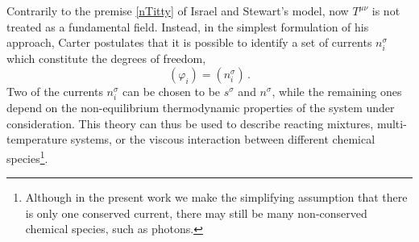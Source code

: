 \documentclass[a4paper, amsfonts, amssymb, amsmath, reprint, twocolumn, showkeys, nofootinbib]{revtex4-2}
\begin{document}
Contrarily to the premise \eqref{nTitty} of Israel and Stewart's model, now $T^{\mu \nu}$ is not treated  as a fundamental field. Instead, in the simplest formulation of his approach,  Carter postulates that it is possible to identify a set of currents $n_i^\sigma$ which constitute the degrees of freedom,
\begin{equation}\label{VARFNIU}
(\varphi_i) = (n_i^\sigma) \, .
\end{equation}
Two of the currents $n_i^\sigma$ can be chosen to be $s^\sigma$ and $n^\sigma$, while the remaining ones depend on the non-equilibrium thermodynamic properties of the system under consideration. This theory can thus be used to describe reacting mixtures, multi-temperature systems, or the viscous interaction between different chemical species\footnote{Although in the present work we make the simplifying assumption that there is only one conserved current, there may still be many non-conserved chemical species, such as photons.}. 
\end{document}

